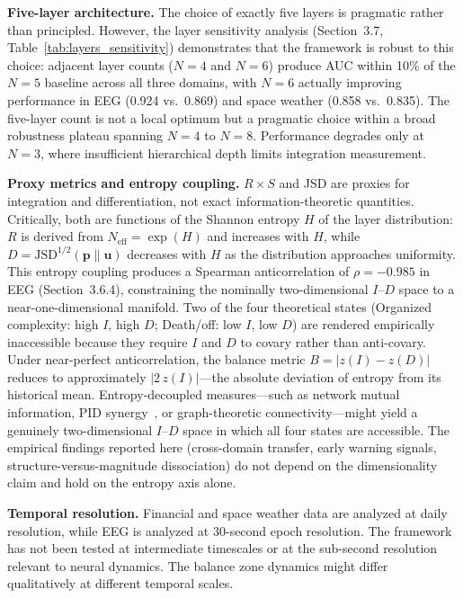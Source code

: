 \documentclass[aip,cha,reprint,amsmath,amssymb,final]{revtex4-2}
\begin{document}
\textbf{Five-layer architecture.} The choice of exactly five layers is pragmatic rather than principled. However, the layer sensitivity analysis (Section~3.7, Table~\ref{tab:layers_sensitivity}) demonstrates that the framework is robust to this choice: adjacent layer counts ($N = 4$ and $N = 6$) produce AUC within 10\% of the $N = 5$ baseline across all three domains, with $N = 6$ actually improving performance in EEG (0.924 vs.\ 0.869) and space weather (0.858 vs.\ 0.835). The five-layer count is not a local optimum but a pragmatic choice within a broad robustness plateau spanning $N = 4$ to $N = 8$. Performance degrades only at $N = 3$, where insufficient hierarchical depth limits integration measurement.

\textbf{Proxy metrics and entropy coupling.} $R \times S$ and JSD are proxies for integration and differentiation, not exact information-theoretic quantities. Critically, both are functions of the Shannon entropy $H$ of the layer distribution: $R$ is derived from $N_{\text{eff}} = \exp(H)$ and increases with $H$, while $D = \text{JSD}^{1/2}(\mathbf{p} \| \mathbf{u})$ decreases with $H$ as the distribution approaches uniformity. This entropy coupling produces a Spearman anticorrelation of $\rho = -0.985$ in EEG (Section~3.6.4), constraining the nominally two-dimensional $I$--$D$ space to a near-one-dimensional manifold. Two of the four theoretical states (Organized complexity: high $I$, high $D$; Death/off: low $I$, low $D$) are rendered empirically inaccessible because they require $I$ and $D$ to covary rather than anti-covary. Under near-perfect anticorrelation, the balance metric $B = |z(I) - z(D)|$ reduces to approximately $|2\,z(I)|$---the absolute deviation of entropy from its historical mean. Entropy-decoupled measures---such as network mutual information, PID synergy~\cite{williams2010}, or graph-theoretic connectivity---might yield a genuinely two-dimensional $I$--$D$ space in which all four states are accessible. The empirical findings reported here (cross-domain transfer, early warning signals, structure-versus-magnitude dissociation) do not depend on the dimensionality claim and hold on the entropy axis alone.

\textbf{Temporal resolution.} Financial and space weather data are analyzed at daily resolution, while EEG is analyzed at 30-second epoch resolution. The framework has not been tested at intermediate timescales or at the sub-second resolution relevant to neural dynamics. The balance zone dynamics might differ qualitatively at different temporal scales.
\end{document}

